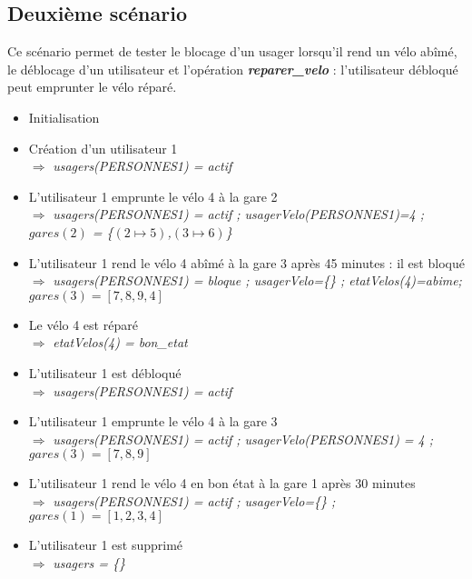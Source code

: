 \documentclass[12pt]{article}
\begin{document}
\subsection{Deuxième scénario}
Ce scénario permet de tester le blocage d'un usager lorsqu'il rend un vélo abîmé, le déblocage d'un utilisateur et l'opération \textit{\textbf{reparer\_velo}} : l'utilisateur débloqué peut emprunter le vélo réparé.
\begin{itemize}
  \item Initialisation
  \item Création d'un utilisateur 1 \\
  $\Rightarrow$ \textit{usagers(PERSONNES1) = actif}
  \item L'utilisateur 1 emprunte le vélo 4 à la gare 2 \\
  $\Rightarrow$ \textit{usagers(PERSONNES1) = actif ; usagerVelo(PERSONNES1)=4 ; $gares(2)$ = \{$(2\mapsto5)$,$(3\mapsto6)$\}}
  \item L'utilisateur 1 rend le vélo 4 abîmé à la gare 3 après 45 minutes : il est bloqué \\
  $\Rightarrow$ \textit{usagers(PERSONNES1) = bloque ; usagerVelo=\{\} ; etatVelos(4)=abime; $gares(3) = [7,8,9,4]$}
  \item Le vélo 4 est réparé \\
  $\Rightarrow$ \textit{etatVelos(4) = bon\_etat}
  \item L'utilisateur 1 est débloqué \\
  $\Rightarrow$ \textit{usagers(PERSONNES1) = actif}
  \item L'utilisateur 1 emprunte le vélo 4 à la gare 3 \\
  $\Rightarrow$ \textit{usagers(PERSONNES1) = actif ; usagerVelo(PERSONNES1) = 4 ; $gares(3) = [7,8,9]$}
  \item L'utilisateur 1 rend le vélo 4 en bon état à la gare 1 après 30 minutes \\
  $\Rightarrow$ \textit{usagers(PERSONNES1) = actif ; usagerVelo=\{\} ; $gares(1) = [1,2,3,4]$}
  \item L'utilisateur 1 est supprimé \\
  $\Rightarrow$ \textit{usagers = \{\}}
\end{itemize}
\end{document}
